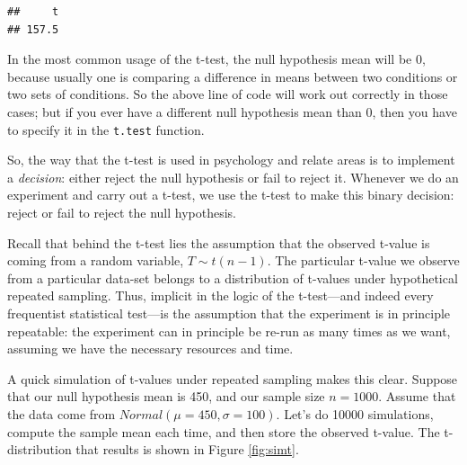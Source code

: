 \documentclass[12pt,]{krantz}
\newenvironment{Shaded}{\begin{snugshade}}{\end{snugshade}}
\newcommand{\KeywordTok}[1]{\textcolor[rgb]{0.13,0.29,0.53}{\textbf{#1}}}
\newcommand{\NormalTok}[1]{#1}
\newcommand{\OperatorTok}[1]{\textcolor[rgb]{0.81,0.36,0.00}{\textbf{#1}}}
\begin{document}
\begin{Shaded}
\end{Shaded}

\begin{verbatim}
##     t 
## 157.5
\end{verbatim}

In the most common usage of the t-test, the null hypothesis mean will be \(0\), because usually one is comparing a difference in means between two conditions or two sets of conditions. So the above line of code will work out correctly in those cases; but if you ever have a different null hypothesis mean than \(0\), then you have to specify it in the \texttt{t.test} function.

So, the way that the t-test is used in psychology and relate areas is to implement a \emph{decision}: either reject the null hypothesis or fail to reject it. Whenever we do an experiment and carry out a t-test, we use the t-test to make this binary decision: reject or fail to reject the null hypothesis.

Recall that behind the t-test lies the assumption that the observed t-value is coming from a random variable, \(T\sim t(n-1)\). The particular t-value we observe from a particular data-set belongs to a distribution of t-values under hypothetical repeated sampling. Thus, implicit in the logic of the t-test---and indeed every frequentist statistical test---is the assumption that the experiment is in principle repeatable: the experiment can in principle be re-run as many times as we want, assuming we have the necessary resources and time.

A quick simulation of t-values under repeated sampling makes this clear. Suppose that our null hypothesis mean is 450, and our sample size \(n=1000\). Assume that the data come from \(Normal(\mu=450,\sigma=100)\). Let's do 10000 simulations, compute the sample mean each time, and then store the observed t-value. The t-distribution that results is shown in Figure \ref{fig:simt}.
\end{document}
